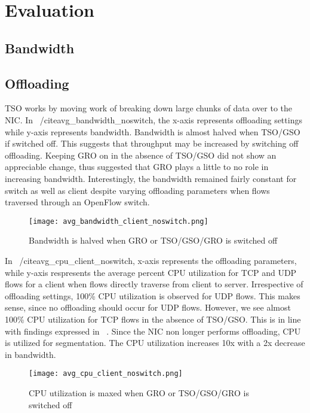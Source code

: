 \documentclass[letterpaper,twocolumn,10pt]{article}
\begin{document}
\section{Evaluation} 
\subsection{Bandwidth} 

\subsection{Offloading} 
TSO works by moving work of breaking down large chunks of data over to the NIC.
In ~/cite{avg_bandwidth_noswitch}, the x-axis represents offloading settings
while y-axis represents bandwidth. Bandwidth is almost halved
when TSO/GSO if switched off. This suggests that throughput may be increased by
switching off offloading. Keeping GRO on in the absence of TSO/GSO did not show
an appreciable change, thus suggested that GRO plays a little to no role in
increasing bandwidth. Interestingly, the bandwidth remained fairly constant for
switch as well as client despite varying offloading parameters when flows
traversed through an OpenFlow switch. 
\begin{figure}[t]
\texttt{[image: avg\_bandwidth\_client\_noswitch.png]}
\caption{Bandwidth is halved when GRO or TSO/GSO/GRO is switched off}
\label{fig:avg_bandwidth_client_noswitch} \end{figure}


In ~/cite{avg_cpu_client_noswitch}, x-axis represents the offloading parameters,
   while y-axis respresents the average percent CPU utilization for TCP and UDP
   flows for a client when flows directly traverse from client to server.
   Irrespective of offloading settings, 100\% CPU utilization is observed for
   UDP flows. This makes sense, since no offloading should occur for UDP flows.
   However, we see almost 100\% CPU utilization for TCP flows in the absence of
   TSO/GSO. This is in line with findings expressed in
   ~\cite{avg_bandwidth_client_noswitch}. Since the NIC non longer performs
   offloading, CPU is utilized for segmentation. The CPU utilization increases
   10x with a 2x decrease in bandwidth. 
\begin{figure}[t] 
\texttt{[image: avg\_cpu\_client\_noswitch.png]}
\caption{CPU utilization is maxed when GRO or TSO/GSO/GRO is switched off}
\label{fig:avg_cpu_client_noswitch} 
\end{figure}
\end{document}
